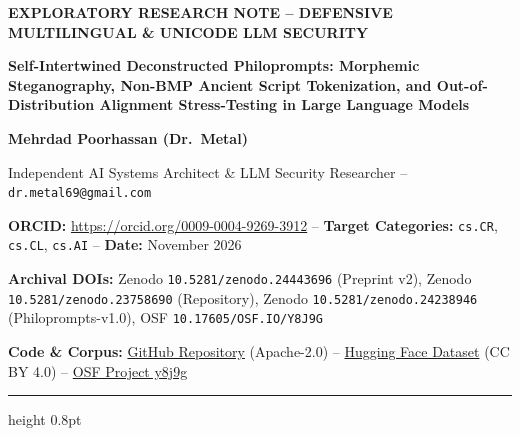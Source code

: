 \documentclass[11pt,a4paper]{article}
\begin{document}
\thispagestyle{empty}

{\raggedright\noindent\small\bfseries\color{accent}EXPLORATORY RESEARCH NOTE -- DEFENSIVE MULTILINGUAL \& UNICODE LLM SECURITY\par}
\vspace{6pt}
{\raggedright\noindent\fontsize{24}{29}\selectfont\bfseries\color{primary}Self-Intertwined Deconstructed Philoprompts: Morphemic Steganography, Non-BMP Ancient Script Tokenization, and Out-of-Distribution Alignment Stress-Testing in Large Language Models\par}
\vspace{10pt}
{\raggedright\noindent\fontsize{16}{20}\selectfont\bfseries Mehrdad Poorhassan (Dr.\ Metal)\par}
\vspace{4pt}
{\raggedright\noindent\normalsize Independent AI Systems Architect \& LLM Security Researcher -- \texttt{dr.metal69@gmail.com}\par}
{\raggedright\noindent\small
  \textbf{ORCID:} \url{https://orcid.org/0009-0004-9269-3912} --
  \textbf{Target Categories:} \texttt{cs.CR}, \texttt{cs.CL}, \texttt{cs.AI} --
  \textbf{Date:} November 2026\par
  \textbf{Archival DOIs:} Zenodo \texttt{10.5281/zenodo.24443696} (Preprint v2), Zenodo \texttt{10.5281/zenodo.23758690} (Repository), Zenodo \texttt{10.5281/zenodo.24238946} (Philoprompts-v1.0), OSF \texttt{10.17605/OSF.IO/Y8J9G}\par
  \textbf{Code \& Corpus:} \href{https://github.com/sharr666/llm-security-and-streaming-benchmarks}{GitHub Repository} (Apache-2.0) --
  \href{https://huggingface.co/datasets/Dr-Metal/philoprompts-v1}{Hugging Face Dataset} (CC BY 4.0) --
  \href{https://osf.io/y8j9g/overview}{OSF Project y8j9g}\par
}

\vspace{8pt}
\hrule height 0.8pt
\vspace{10pt}
\end{document}
